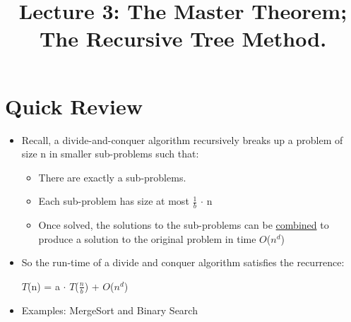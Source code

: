 \documentclass[12pt]{article}
\title{\huge Lecture 3: The Master Theorem; The Recursive Tree Method.}
\author{}
\date{}
\begin{document}
\maketitle
\section{Quick Review}
\renewcommand{\labelitemii}{$\circ$}
\renewcommand{\labelitemiii}{$\cdot$}
\renewcommand{\labelitemiii}{$\rightarrow$}
\begin{itemize}
\item Recall, a divide-and-conquer algorithm recursively breaks up a problem of size n in smaller sub-problems such that:
	\begin{itemize}
	\item There are exactly a sub-problems.
	\item Each sub-problem has size at most $\frac{1}{b}$ $\cdot$ n
	\item Once solved, the solutions to the sub-problems can be \underline{combined} to produce 	a solution to the original problem in time $O$($n^d$)
	\end{itemize}
\item So the run-time of a divide and conquer algorithm satisfies the recurrence:

\hspace*{\fill}\large{$T$(n) = a $\cdot$ $T$($\frac{n}{b}$) + $O$($n^d$)} \hspace*{\fill} 

\item Examples: MergeSort and Binary Search
\end{itemize}
\end{document}
